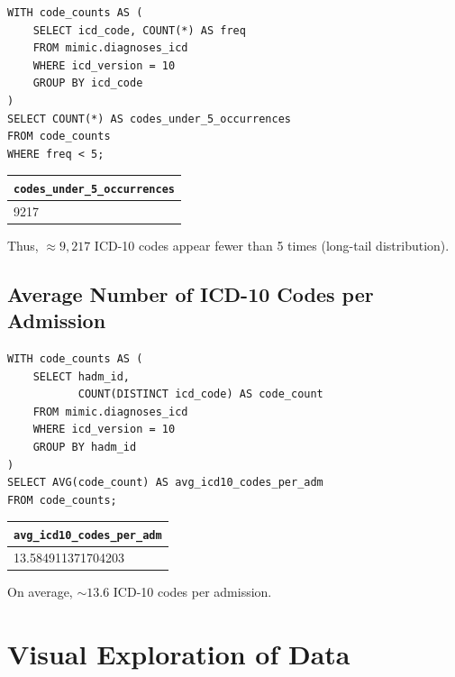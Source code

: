 \documentclass[12pt,a4paper]{report}
\begin{document}
\begin{verbatim}
WITH code_counts AS (
    SELECT icd_code, COUNT(*) AS freq
    FROM mimic.diagnoses_icd
    WHERE icd_version = 10
    GROUP BY icd_code
)
SELECT COUNT(*) AS codes_under_5_occurrences
FROM code_counts
WHERE freq < 5;
\end{verbatim}
\begin{center}
\begin{tabular}{l}
\hline
\texttt{codes\_under\_5\_occurrences} \\
\hline
9217 \\
\hline
\end{tabular}
\end{center}
Thus, \(\approx9{,}217\) ICD-10 codes appear fewer than 5 times (long-tail distribution).

\subsection{Average Number of ICD-10 Codes per Admission}
\begin{verbatim}
WITH code_counts AS (
    SELECT hadm_id,
           COUNT(DISTINCT icd_code) AS code_count
    FROM mimic.diagnoses_icd
    WHERE icd_version = 10
    GROUP BY hadm_id
)
SELECT AVG(code_count) AS avg_icd10_codes_per_adm
FROM code_counts;
\end{verbatim}
\begin{center}
\begin{tabular}{l}
\hline
\texttt{avg\_icd10\_codes\_per\_adm} \\
\hline
13.584911371704203 \\
\hline
\end{tabular}
\end{center}
On average, \(\sim13.6\) ICD-10 codes per admission.

\section{Visual Exploration of Data}
\end{document}
